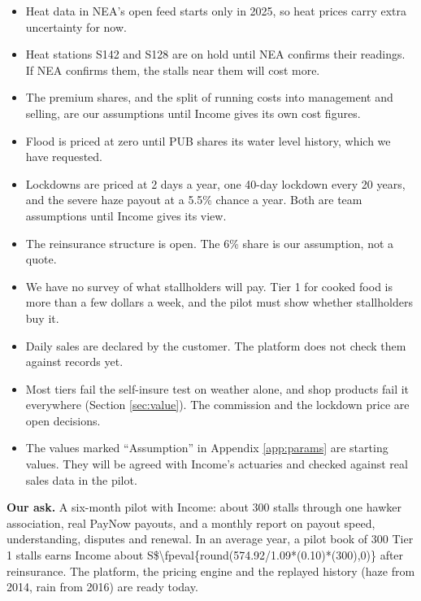 \documentclass[11pt,a4paper]{article}
\newcommand{\sgd}{\textup{S\$}}
\def\bizPremium{574.92}
\newcommand{\biz}[2]{\sgd\num[group-separator={,},group-minimum-digits=4]{\fpeval{round(\bizPremium/1.09*(#1)*(#2),0)}}}
\begin{document}
\begin{itemize}[leftmargin=1.2em]
  \item Heat data in NEA's open feed starts only in 2025, so heat prices carry extra uncertainty for now.
  \item Heat stations S142 and S128 are on hold until NEA confirms their readings. If NEA confirms them, the stalls near them will cost more.
  \item The premium shares, and the split of running costs into management and selling, are our assumptions until Income gives its own cost figures.
  \item Flood is priced at zero until PUB shares its water level history, which we have requested.
  \item Lockdowns are priced at 2 days a year, one 40-day lockdown every 20 years, and the severe haze payout at a 5.5\% chance a year. Both are team assumptions until Income gives its view.
  \item The reinsurance structure is open. The 6\% share is our assumption, not a quote.
  \item We have no survey of what stallholders will pay. Tier 1 for cooked food is more than a few dollars a week, and the pilot must show whether stallholders buy it.
  \item Daily sales are declared by the customer. The platform does not check them against records yet.
  \item Most tiers fail the self-insure test on weather alone, and shop products fail it everywhere (Section \ref{sec:value}). The commission and the lockdown price are open decisions.
  \item The values marked ``Assumption'' in Appendix \ref{app:params} are starting values. They will be agreed with Income's actuaries and checked against real sales data in the pilot.
\end{itemize}

\begin{tcolorbox}[colback=soft,colframe=accent,boxrule=0.6pt,arc=2pt,left=8pt,right=8pt,top=6pt,bottom=6pt]
\textbf{Our ask.} A six-month pilot with Income: about 300 stalls through one hawker association, real PayNow payouts, and a monthly report on payout speed, understanding, disputes and renewal. In an average year, a pilot book of 300 Tier 1 stalls earns Income about \biz{0.10}{300} after reinsurance. The platform, the pricing engine and the replayed history (haze from 2014, rain from 2016) are ready today.
\end{tcolorbox}
\end{document}
